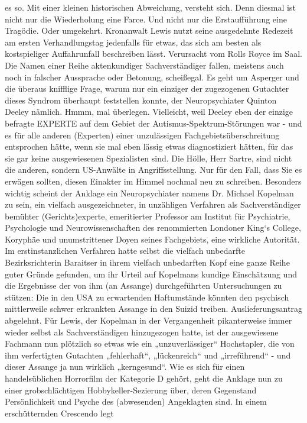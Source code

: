 \begin{multicols}{2}
{es so. Mit einer kleinen historischen Abweichung, versteht sich. Denn diesmal ist nicht nur die Wiederholung
eine Farce. Und nicht nur die Erstaufführung eine Tragödie. Oder umgekehrt. \textCR
Kronanwalt Lewis nutzt seine ausgedehnte Redezeit am
ersten Verhandlungstag jedenfalls für etwas, das sich am
besten als kostspieliger Auffahrunfall beschreiben lässt.
Verursacht vom Rolls Royce im Saal. \textCR
Die Namen einer Reihe aktenkundiger Sachverständiger fallen, meistens auch noch in falscher Aussprache
oder Betonung, scheißegal. Es geht um Asperger und
die überaus knifflige Frage, warum nur ein einziger der
zugezogenen Gutachter dieses Syndrom überhaupt feststellen konnte, der Neuropsychiater Quinton Deeley
nämlich. Hmmm, mal überlegen. Vielleicht, weil Deeley
eben der einzige befragte EXPERTE auf dem Gebiet der
Autismus-Spektrum-Störungen war - und es für alle anderen (Experten) einer unzulässigen Fachgebietsüberschreitung entsprochen hätte, wenn sie mal eben lässig
etwas diagnostiziert hätten, für das sie gar keine ausgewiesenen Spezialisten sind. Die Hölle, Herr Sartre, sind
nicht die anderen, sondern US-Anwälte in Angriffsstellung. Nur für den Fall, dass Sie es erwägen sollten, diesen
Einakter im Himmel nochmal neu zu schreiben. \textCR
Besonders wichtig scheint der Anklage ein Neuropsychiater namens Dr. Michael Kopelman zu sein, ein vielfach ausgezeichneter, in unzähligen Verfahren als Sachverständiger bemühter (Gerichts)experte, emeritierter
Professor am Institut für Psychiatrie, Psychologie und
Neurowissenschaften des renommierten Londoner
King‘s College, Koryphäe und unumstrittener Doyen
seines Fachgebiets, eine wirkliche Autorität. Im erstinstanzlichen Verfahren hatte selbst die vielfach unbedarfte
Bezirksrichterin Baraitser in ihrem vielfach unbedarften
Kopf eine ganze Reihe guter Gründe gefunden, um ihr
Urteil auf Kopelmans kundige Einschätzung und die Ergebnisse der von ihm (an Assange) durchgeführten Untersuchungen zu stützen: Die in den USA zu erwartenden Haftumstände könnten den psychisch mittlerweile
schwer erkrankten Assange in den Suizid treiben. Auslieferungsantrag abgelehnt. \textCR
Für Lewis, der Kopelman in der Vergangenheit pikanterweise immer wieder selbst als Sachverständigen
hinzugezogen hatte, ist der ausgewiesene Fachmann
nun plötzlich so etwas wie ein „unzuverlässiger“ Hochstapler, die von ihm verfertigten Gutachten „fehlerhaft“,
„lückenreich“ und „irreführend“ - und dieser Assange ja
nun wirklich „kerngesund“. \textCR
Wie es sich für einen handelsüblichen Horrorfilm der
Kategorie D gehört, geht die Anklage nun zu einer grobschlächtigen Hobbykeller-Sezierung über, deren Gegenstand Persönlichkeit und Psyche des (abwesenden) Angeklagten sind. In einem erschütternden Crescendo legt
}
\end{multicols}
